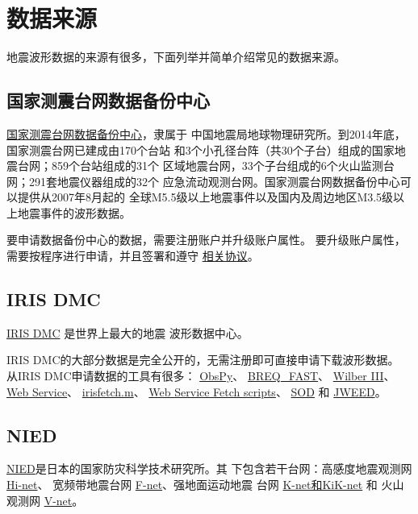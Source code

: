 \section{数据来源}
地震波形数据的来源有很多，下面列举并简单介绍常见的数据来源。

\subsection{国家测震台网数据备份中心}
\href{http://www.seisdmc.ac.cn/}{国家测震台网数据备份中心}，隶属于
中国地震局地球物理研究所。到2014年底，国家测震台网已建成由170个台站
和3个小孔径台阵（共30个子台）组成的国家地震台网；859个台站组成的31个
区域地震台网，33个子台组成的6个火山监测台网；291套地震仪器组成的32个
应急流动观测台网。国家测震台网数据备份中心可以提供从2007年8月起的
全球M5.5级以上地震事件以及国内及周边地区M3.5级以上地震事件的波形数据。

要申请数据备份中心的数据，需要注册账户并升级账户属性。
要升级账户属性，需要按程序进行申请，并且签署和遵守
\href{http://www.seisdmc.ac.cn/class/view?id=8}{相关协议}。

\subsection{IRIS DMC}
\label{subsec:IRIS}
\href{http://ds.iris.edu/ds/nodes/dmc/}{IRIS DMC} 是世界上最大的地震
波形数据中心。

IRIS DMC的大部分数据是完全公开的，无需注册即可直接申请下载波形数据。
从IRIS DMC申请数据的工具有很多：
\href{http://docs.obspy.org/}{ObsPy}、
\href{https://ds.iris.edu/ds/nodes/dmc/manuals/breq_fast/}{BREQ\_FAST}、
\href{http://ds.iris.edu/wilber3/find_event}{Wilber III}、
\href{http://service.iris.edu/}{Web Service}、
\href{http://ds.iris.edu/ds/nodes/dmc/software/downloads/irisfetch.m/}{irisfetch.m}、
\href{https://seiscode.iris.washington.edu/projects/ws-fetch-scripts}{Web Service Fetch scripts}、
\href{http://www.seis.sc.edu/sod/}{SOD} 和
\href{https://ds.iris.edu/ds/nodes/dmc/software/downloads/jweed/}{JWEED}。

\subsection{NIED}
\label{subsec:NIED}
\href{http://www.bosai.go.jp/}{NIED}是日本的国家防灾科学技术研究所。其
下包含若干台网：高感度地震观测网 \href{http://www.hinet.bosai.go.jp/}{Hi-net}、
宽频带地震台网 \href{http://www.fnet.bosai.go.jp/}{F-net}、强地面运动地震
台网 \href{http://www.kyoshin.bosai.go.jp/}{K-net和KiK-net} 和
火山观测网 \href{http://www.vnet.bosai.go.jp/}{V-net}。

